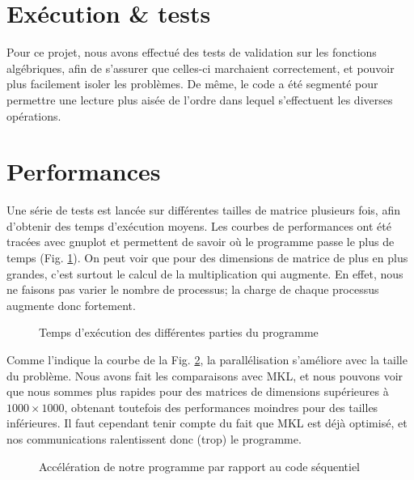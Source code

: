 \section{Exécution \& tests} %
\label{sec:execution}

Pour ce projet, nous avons effectué des tests de validation sur les fonctions algébriques, afin de s'assurer que celles-ci marchaient correctement, et pouvoir plus facilement isoler les problèmes. 
De même, le code a été segmenté pour permettre une lecture plus aisée de l'ordre dans lequel s'effectuent les diverses opérations.

\section{Performances} %
\label{sec:perf}

Une série de tests est lancée sur différentes tailles de matrice plusieurs fois, afin d'obtenir des temps d'exécution moyens.
Les courbes de performances ont été tracées avec gnuplot et permettent de savoir où le programme passe le plus de temps (Fig. \ref{fig:diff}). On peut voir que pour des dimensions de matrice de plus en plus grandes, c'est surtout le calcul de la multiplication qui augmente. En effet, nous ne faisons pas varier le nombre de processus; la charge de chaque processus augmente donc fortement.

\begin{figure}[H]
\centering
\caption{Temps d'exécution des différentes parties du programme}
\label{fig:diff}
\end{figure}

Comme l'indique la courbe de la Fig. \ref{fig:sp}, la parallélisation s'améliore avec la taille du problème. Nous avons fait les comparaisons avec MKL, et nous pouvons voir que nous sommes plus rapides pour des matrices de dimensions supérieures à $1000\times1000$, obtenant toutefois des performances moindres pour des tailles inférieures. Il faut cependant tenir compte du fait que MKL est déjà optimisé, et nos communications ralentissent donc (trop) le programme.

\begin{figure}[H]
\centering
\caption{Accélération de notre programme par rapport au code séquentiel}
\label{fig:sp}
\end{figure}

